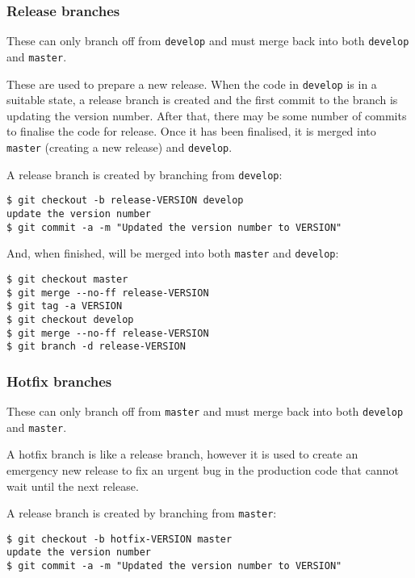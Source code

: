 \documentclass[12pt,a4paper]{article}
\begin{document}
\subsubsection{Release branches}

These can only branch off from \texttt{develop} and must merge back
into both \texttt{develop} and \texttt{master}.

These are used to prepare a new release. When the code in
\texttt{develop} is in a suitable state, a release branch is created
and the first commit to the branch is updating the version
number. After that, there may be some number of commits to finalise
the code for release. Once it has been finalised, it is merged into
\texttt{master} (creating a new release) and \texttt{develop}.

A release branch is created by branching from \texttt{develop}:

\begin{verbatim}
$ git checkout -b release-VERSION develop
update the version number
$ git commit -a -m "Updated the version number to VERSION"
\end{verbatim}

And, when finished, will be merged into both \texttt{master} and
\texttt{develop}:

\begin{verbatim}
$ git checkout master
$ git merge --no-ff release-VERSION
$ git tag -a VERSION
$ git checkout develop
$ git merge --no-ff release-VERSION
$ git branch -d release-VERSION
\end{verbatim}

\subsubsection{Hotfix branches}

These can only branch off from \texttt{master} and must merge back
into both \texttt{develop} and \texttt{master}.

A hotfix branch is like a release branch, however it is used to create
an emergency new release to fix an urgent bug in the production code
that cannot wait until the next release.

A release branch is created by branching from \texttt{master}:

\begin{verbatim}
$ git checkout -b hotfix-VERSION master
update the version number
$ git commit -a -m "Updated the version number to VERSION"
\end{verbatim}
\end{document}
